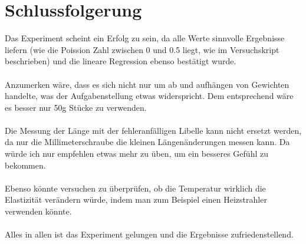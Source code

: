\documentclass[bibliography=totocnumbered]{scrartcl}
\begin{document}
	\section{Schlussfolgerung}
	Das Experiment scheint ein Erfolg zu sein, da alle Werte sinnvolle Ergebnisse liefern (wie die Poission Zahl zwischen 0 und 0.5 liegt, wie im Versuchskript\smartcite{Muller.e} beschrieben) und die lineare Regression ebenso bestätigt wurde.\\\\
	Anzumerken wäre, dass es sich nicht nur um ab und aufhängen von Gewichten handelte, was der Aufgabenstellung etwas widerspricht. Dem entsprechend wäre es besser nur 50g Stücke zu verwenden.\\\\
	Die Messung der Länge mit der fehleranfälligen Libelle kann nicht ersetzt werden, da nur die Millimeterschraube die kleinen Längenänderungen messen kann. Da würde ich nur empfehlen etwas mehr zu üben, um ein besseres Gefühl zu bekommen.\\\\
	Ebenso könnte versuchen zu überprüfen, ob die Temperatur wirklich die Elastizität verändern würde, indem man zum Beispiel einen Heizstrahler verwenden könnte.\\\\
	Alles in allen ist das Experiment gelungen und die Ergebnisse zufriedenstellend.
	
	\appendix
	\newpage
	\printbibliography[title={Quellenverzeichnis}]
	
	
\end{document}
